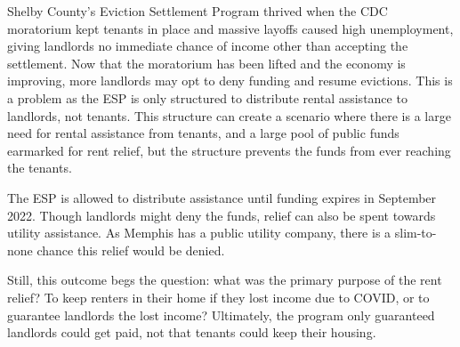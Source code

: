 \documentclass[
]{book}
\begin{document}
Shelby County's Eviction Settlement Program thrived when the CDC moratorium kept tenants in place and massive layoffs caused high unemployment, giving landlords no immediate chance of income other than accepting the settlement. Now that the moratorium has been lifted and the economy is improving, more landlords may opt to deny funding and resume evictions. This is a problem as the ESP is only structured to distribute rental assistance to landlords, not tenants. This structure can create a scenario where there is a large need for rental assistance from tenants, and a large pool of public funds earmarked for rent relief, but the structure prevents the funds from ever reaching the tenants.

The ESP is allowed to distribute assistance until funding expires in September 2022. Though landlords might deny the funds, relief can also be spent towards utility assistance. As Memphis has a public utility company, there is a slim-to-none chance this relief would be denied.

Still, this outcome begs the question: what was the primary purpose of the rent relief? To keep renters in their home if they lost income due to COVID, or to guarantee landlords the lost income? Ultimately, the program only guaranteed landlords could get paid, not that tenants could keep their housing.

  
\end{document}
